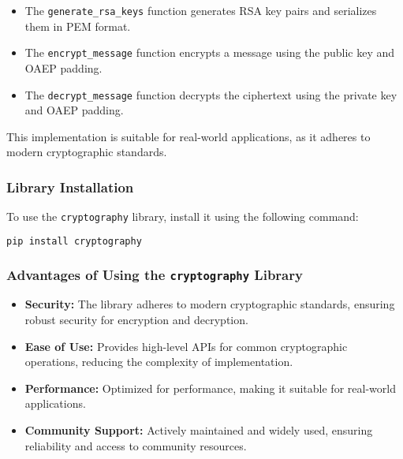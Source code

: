 \documentclass[12pt,a4paper]{report}
\begin{document}
\begin{itemize}
    \item The {\texttt{generate\_rsa\_keys}} function generates RSA key pairs and serializes them in PEM format.
    \item The \texttt{encrypt\_message} function encrypts a message using the public key and OAEP padding.
    \item The \texttt{decrypt\_message} function decrypts the ciphertext using the private key and OAEP padding.
\end{itemize}

This implementation is suitable for real-world applications, as it adheres to modern cryptographic standards.

\subsubsection{Library Installation}
To use the \texttt{cryptography} library, install it using the following command:
\begin{lstlisting}[language=bash]
pip install cryptography
\end{lstlisting}

\subsubsection{Advantages of Using the \texttt{cryptography} Library}
\begin{itemize}
    \item \textbf{Security:} The library adheres to modern cryptographic standards, ensuring robust security for encryption and decryption.
    \item \textbf{Ease of Use:} Provides high-level APIs for common cryptographic operations, reducing the complexity of implementation.
    \item \textbf{Performance:} Optimized for performance, making it suitable for real-world applications.
    \item \textbf{Community Support:} Actively maintained and widely used, ensuring reliability and access to community resources.
\end{itemize}
\end{document}
